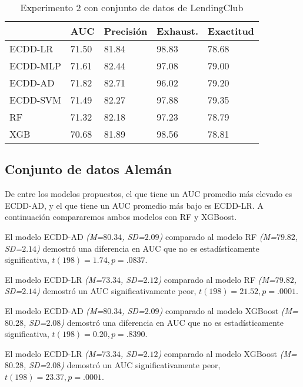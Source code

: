 \begin{table}[htbp]
\centering
\caption{Experimento 2 con conjunto de datos de LendingClub}
\label{tab:lc-proc2}
\begin{tabularx}{0.75\textwidth}{|l|Y Y Y Y|}
				\hline
				& AUC		& Precisión	& Exhaust.		& Exactitud	\\
				\hline
ECDD-LR			& 71.50		& 81.84		& 98.83			& 78.68		\\		%
ECDD-MLP		& 71.61		& 82.44		& 97.08			& 79.00		\\		%
ECDD-AD			& 71.82		& 82.71		& 96.02			& 79.20		\\		%
ECDD-SVM		& 71.49		& 82.27		& 97.88			& 79.35		\\		%
				\hline
RF				& 71.32		& 82.18		& 97.23			& 78.79		\\		%
XGB				& 70.68		& 81.89		& 98.56			& 78.81		\\		%
				\hline
\end{tabularx}
\end{table}

\subsection{Conjunto de datos Alemán}

De entre los modelos propuestos, el que tiene un \ac{AUC} promedio más elevado es ECDD-AD, y el que tiene un \ac{AUC} promedio más bajo es ECDD-LR. A continuación compararemos ambos modelos con \ac{RF} y \ac{XGBoost}.

El modelo ECDD-AD \textit{(M=$80.34$, SD=$2.09$)} comparado al modelo \ac{RF} \textit{(M=$79.82$, SD=$2.14$)} demostró una diferencia en \ac{AUC} que no es estadísticamente significativa, $t(198)=1.74, p=.0837$.

El modelo ECDD-LR  \textit{(M=$73.34$, SD=$2.12$)} comparado al modelo \ac{RF} \textit{(M=$79.82$, SD=$2.14$)} demostró un \ac{AUC} significativamente peor, $t(198)=21.52, p=.0001$.

El modelo ECDD-AD \textit{(M=$80.34$, SD=$2.09$)} comparado al modelo \ac{XGBoost} \textit{(M=$80.28$, SD=$2.08$)} demostró una diferencia en \ac{AUC} que no es estadísticamente significativa, $t(198)=0.20, p=.8390$.

El modelo ECDD-LR \textit{(M=$73.34$, SD=$2.12$)} comparado al modelo \ac{XGBoost} \textit{(M=$80.28$, SD=$2.08$)} demostró un \ac{AUC} significativamente peor, $t(198)=23.37, p=.0001$.


